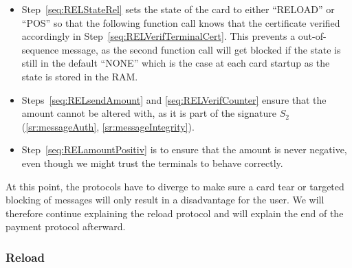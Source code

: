 \documentclass{article}
\begin{document}
\begin{itemize}
    \item Step~\ref{seq:RELStateRel} sets the state of the card to either ``RELOAD'' or ``POS'' so that the following function call knows that the certificate verified accordingly in Step~\ref{seq:RELVerifTerminalCert}.
    This prevents a out-of-sequence message, as the second function call will get blocked if the state is still in the default ``NONE'' which is the case at each card startup as the state is stored in the RAM.
    
    \item Steps~\ref{seq:RELsendAmount} and \ref{seq:RELVerifCounter} ensure that the amount cannot be altered with, as it is part of the signature $S_2$ (\ref{sr:messageAuth}, \ref{sr:messageIntegrity}).

    \item Step~\ref{seq:RELamountPositiv} is to ensure that the amount is never negative, even though we might trust the terminals to behave correctly.
    
    \end{itemize}

At this point, the protocols have to diverge to make sure a card tear or targeted blocking of messages will only result in a disadvantage for the user.
We will therefore continue explaining the reload protocol and will explain the end of the payment protocol afterward.

\subsubsection*{Reload}
\end{document}

